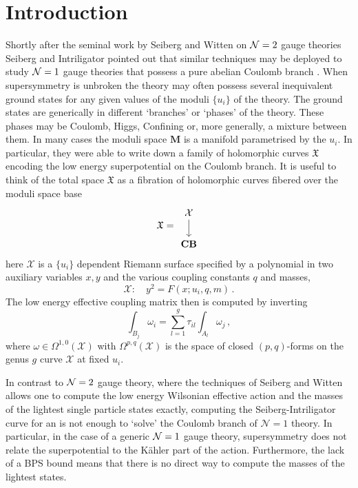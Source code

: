 \documentclass[main.tex]{subfiles}
\begin{document}
 
\section{Introduction}
Shortly after the seminal work by Seiberg and Witten on $\mathcal{N}=2$ gauge theories \cite{Seiberg:1994rs,Seiberg:1994aj} Seiberg and Intriligator pointed out that similar techniques may be deployed to study $\mathcal{N}=1$ gauge theories that possess a pure abelian Coulomb branch \cite{Intriligator:1994sm}. When supersymmetry is unbroken the theory may often possess several inequivalent ground states for any given values of the moduli $\{u_i\}$ of the theory. The ground states are generically in different `branches' or `phases' of the theory. These phases may be Coulomb, Higgs, Confining or, more generally, a mixture between them. In many cases the moduli space $\mathbf{M}$ is a manifold parametrised by the $u_i$. In particular, they were able to write down a family of holomorphic curves $\mathfrak{X}$ encoding the low energy superpotential on the Coulomb branch. 
It is useful to think of the total space $\mathfrak{X}$ as a fibration of holomorphic curves fibered over the moduli space base
\begin{equation}
\mathfrak{X}=\begin{tikzcd}
\mathcal{X}\arrow[d]\\
\mathbf{CB}
\end{tikzcd}
\end{equation}
here $\mathcal{X}$ is a $\{u_i\}$ dependent Riemann surface specified by a polynomial in two auxiliary variables $x,y$ and the various coupling constants $q$ and masses,
\begin{equation}
\mathcal{X}:\quad y^2=F(x;u_i,q,m)\,.
\end{equation}
The low energy effective coupling matrix then is computed by inverting
\begin{equation}
\int_{B_j}\omega_i=\sum_{l=1}^{g}\tau_{il}\int_{A_l}\omega_j\,,
\end{equation}
where $\omega\in\Omega^{1,0}(\mathcal{X})$ with $\Omega^{p,q}(\mathcal{X})$ is the space of closed $(p,q)$-forms on the genus $g$ curve $\mathcal{X}$ at fixed $u_i$.

In contrast to $\mathcal{N}=2$ gauge theory, where the techniques of Seiberg and Witten allows one to compute the low energy Wilsonian effective action and the masses of the lightest single particle states exactly, computing the Seiberg-Intriligator curve for an is not enough to `solve' the Coulomb branch of $\mathcal{N}=1$ theory. In particular, in the case of a generic $\mathcal{N}=1$ gauge theory, supersymmetry does not relate the superpotential to the K\"ahler part of the action. Furthermore, the lack of a BPS bound means that there is no direct way to compute the masses of the lightest states. 
\end{document}

